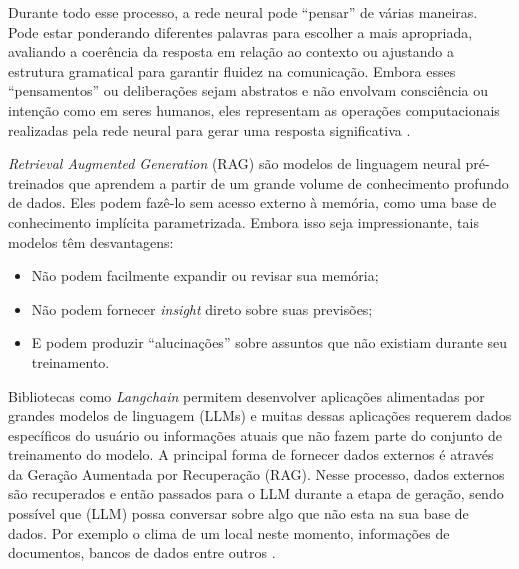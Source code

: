 \documentclass[10pt, conference, compsocconf]{IEEEtran}
\begin{document}
Durante todo esse processo, a rede neural pode ``pensar'' de várias maneiras. Pode estar ponderando diferentes palavras para escolher a mais apropriada, avaliando a coerência da resposta em relação ao contexto ou ajustando a estrutura gramatical para garantir fluidez na comunicação. Embora esses ``pensamentos'' ou deliberações sejam abstratos e não envolvam consciência ou intenção como em seres humanos, eles representam as operações computacionais realizadas pela rede neural para gerar uma resposta significativa \cite{NEURIPS2020_1457c0d6}.

\textit{Retrieval Augmented Generation} (RAG) são  modelos de linguagem neural pré-treinados que aprendem a partir de um grande volume de conhecimento profundo de dados. Eles podem fazê-lo sem acesso externo à memória, como uma base de conhecimento implícita parametrizada. Embora isso seja impressionante, tais modelos têm desvantagens:
\begin{itemize}
    \item Não podem facilmente expandir ou revisar sua memória;
    \item Não podem fornecer \textit{insight} direto sobre suas previsões;
    \item E podem produzir ``alucinações'' sobre assuntos que não existiam durante seu treinamento.
\end{itemize}
Bibliotecas como \textit{Langchain} permitem desenvolver aplicações alimentadas por grandes modelos de linguagem (LLMs) e muitas dessas aplicações requerem dados específicos do usuário ou informações atuais que não fazem parte do conjunto de treinamento do modelo. A principal forma de fornecer dados externos é através da Geração Aumentada por Recuperação (RAG). Nesse processo, dados externos são recuperados e então passados para o LLM durante a etapa de geração, sendo possível que (LLM) possa conversar sobre algo que não esta na sua base de dados. Por exemplo o clima de um local neste momento, informações de documentos, bancos de dados entre outros \cite{lewis2020retrieval}.



\end{document}
